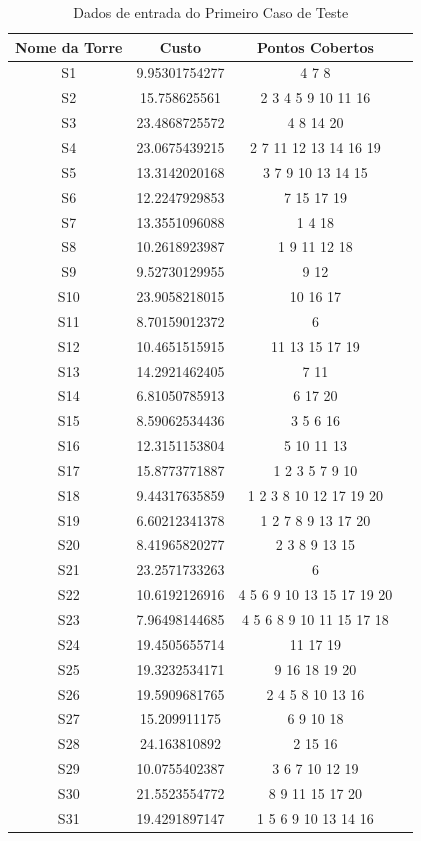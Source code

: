 \documentclass[12pt]{article}
\begin{document}
\begin{table}

\centering

\caption{Dados de entrada do Primeiro Caso de Teste}
\begin{tabular}{cccc}

\hline
Nome da Torre & Custo & Pontos Cobertos\\

\hline
\hline

S1 & 9.95301754277 & 4 7 8 \\
S2 & 15.758625561 & 2 3 4 5 9 10 11 16 \\
S3 & 23.4868725572 & 4 8 14 20 \\
S4 & 23.0675439215 & 2 7 11 12 13 14 16 19 \\
S5 & 13.3142020168 & 3 7 9 10 13 14 15 \\
S6 & 12.2247929853 & 7 15 17 19 \\
S7 & 13.3551096088 & 1 4 18 \\
S8 & 10.2618923987 & 1 9 11 12 18 \\
S9 & 9.52730129955 & 9 12 \\
S10 & 23.9058218015 & 10 16 17 \\
S11 & 8.70159012372 & 6 \\
S12 & 10.4651515915 & 11 13 15 17 19 \\
S13 & 14.2921462405 & 7 11 \\
S14 & 6.81050785913 & 6 17 20 \\
S15 & 8.59062534436 & 3 5 6 16 \\
S16 & 12.3151153804 & 5 10 11 13 \\
S17 & 15.8773771887 & 1 2 3 5 7 9 10 \\
S18 & 9.44317635859 & 1 2 3 8 10 12 17 19 20 \\
S19 & 6.60212341378 & 1 2 7 8 9 13 17 20 \\
S20 & 8.41965820277 & 2 3 8 9 13 15 \\
S21 & 23.2571733263 & 6 \\
S22 & 10.6192126916 & 4 5 6 9 10 13 15 17 19 20 \\
S23 & 7.96498144685 & 4 5 6 8 9 10 11 15 17 18 \\
S24 & 19.4505655714 & 11 17 19 \\
S25 & 19.3232534171 & 9 16 18 19 20 \\
S26 & 19.5909681765 & 2 4 5 8 10 13 16 \\
S27 & 15.209911175 & 6 9 10 18 \\
S28 & 24.163810892 & 2 15 16 \\
S29 & 10.0755402387 & 3 6 7 10 12 19 \\
S30 & 21.5523554772 & 8 9 11 15 17 20 \\
S31 & 19.4291897147 & 1 5 6 9 10 13 14 16 \\

\hline
\end{tabular}
\label{tab1}
\end{table}
\end{document}
